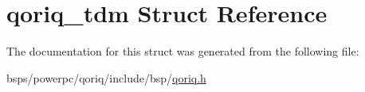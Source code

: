 \hypertarget{structqoriq__tdm}{}\section{qoriq\+\_\+tdm Struct Reference}
\label{structqoriq__tdm}


The documentation for this struct was generated from the following file\+:\begin{DoxyCompactItemize}
\item 
bsps/powerpc/qoriq/include/bsp/\mbox{\hyperlink{qoriq_8h}{qoriq.\+h}}\end{DoxyCompactItemize}
